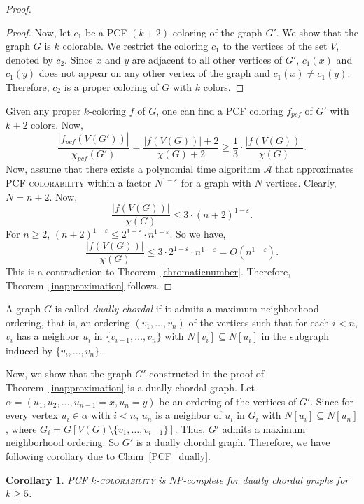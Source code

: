 \documentclass[11pt]{article}
\theoremstyle{plain}
\newtheorem{coro}{Corollary}
\begin{document}
\begin{proof}
\begin{proof}
			\medskip
			
			Now, let $c_1$ be a PCF $(k+2)$-coloring of the graph $G'$. We show that the graph $G$ is $k$ colorable. We restrict the coloring $c_1$ to the vertices of the set $V$, denoted  by $c_2$. Since $x$ and $y$ are adjacent to all other vertices of $G'$, $c_1(x)$ and $c_1(y)$ does not appear on any other vertex of the graph and $c_1(x) \neq c_1(y)$. Therefore, $c_2$ is a proper coloring of $G$ with $k$ colors. 
		\end{proof}
		
		Given any proper $k$-coloring $f$ of $G$, one can find a PCF coloring $f_{pcf}$ of $G'$ with $k+2$ colors. 
		Now, 
		$$ \frac{|f_{pcf}(V(G'))|}{\chi_{pcf}(G')} =  \frac{|f(V(G))|+2}{\chi(G)+2} \geq \frac{1}{3}\cdot\frac{|f(V(G))|}{\chi(G)}.$$
		Now, assume that there exists a polynomial time algorithm $\mathcal{A}$ that approximates PCF \textsc{colorability} within a factor $N^{1-\varepsilon}$ for a graph with $N$ vertices. Clearly, $N = n+2$. Now, 
		$$ \frac{|f(V(G))|}{\chi(G)} \leq 3\cdot (n+2)^{1-\varepsilon}.$$
		For $n\geq2$, $(n+2)^{1-\varepsilon}\leq 2^{1-\varepsilon}\cdot n^{1-\varepsilon}$.
		So we have,
		$$ \frac{|f(V(G))|}{\chi(G)} \leq 3\cdot2^{1-\varepsilon}\cdot n^{1-\varepsilon} = O(n^{1-\varepsilon}).$$
		This is a contradiction to Theorem~\ref{chromaticnumber}. Therefore, Theorem~\ref{inapproximation} follows. 
	\end{proof}
	
	\medskip
	
	A graph $G$ is called \emph{dually chordal} if it admits a maximum neighborhood ordering, that is, an ordering $(v_1,\dots,v_n)$ of the vertices such that for each $i<n$, $v_i$ has a neighbor $u_i$ in $\{v_{i+1},\dots,v_n\}$ with $N[v_i]\subseteq N[u_i]$ in the subgraph induced by $\{v_i,\dots,v_n\}$. 
	
	\medskip
	
	Now, we show that the graph $G'$ constructed in the proof of Theorem~\ref{inapproximation} is a dually chordal graph. Let $\alpha = (u_1, u_2, \ldots, u_{n-1} = x, u_n = y)$ be an ordering of the vertices of $G'$. 
	Since for every vertex $u_i \in \alpha$ with $i < n$, $u_n$ is a neighbor of $u_i$ in $G_i$ with $N[u_i]\subseteq N[u_n]$, where $G_i = G[V(G)\setminus\{v_1, \ldots, v_{i-1}\}]$. Thus, $G'$ admits a maximum neighborhood ordering. So $G'$ is a dually chordal graph. Therefore, we have following corollary due to Claim~\ref{PCF_dually}.
	\begin{coro}
		PCF $k$-\textsc{colorability} is NP-complete for dually chordal graphs for $k \geq 5$.
	\end{coro}
	
\end{document}
